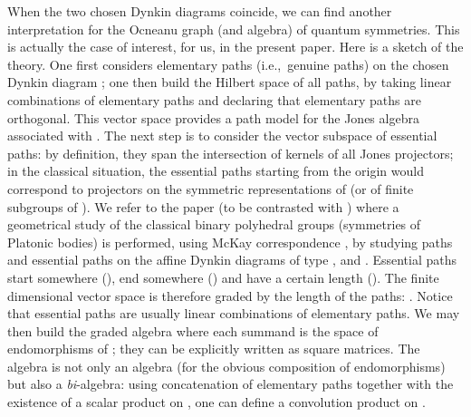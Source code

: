 \documentclass[a4paper,11pt]{article}
\def\ie{{\rm i.e.,\/}\ }
\begin{document}
When the two chosen Dynkin diagrams coincide, we can find
another interpretation for the Ocneanu graph (and algebra)
of quantum symmetries. This is actually the case of interest, for us, in
the present paper. Here is a sketch of the theory.
One first considers elementary paths (\ie genuine
paths) on the chosen Dynkin diagram \coordHE{}; one then build the
Hilbert space \coordHE{} of all paths, by taking linear
combinations of elementary paths and declaring that elementary paths
are orthogonal. This vector space provides a path model for the Jones
algebra associated with \coordHE{}. The next step is to consider the vector subspace
\coordHE{} of essential paths: by definition, they span the
intersection of kernels of all Jones projectors; in the classical
situation, the essential paths starting from the origin
would correspond to projectors on the symmetric
representations of
\coordHE{} (or of finite subgroups of \coordHE{}). We refer to the paper
\cite{Coque:Karpacz} (to be contrasted with \cite{Coque:qtetra}) where a
geometrical study of the classical binary polyhedral groups \cite{Klein}
(symmetries of Platonic
bodies) is performed, using McKay correspondence \cite{McKay}, by
studying paths and essential paths on the
affine Dynkin diagrams of type \coordHE{}, \coordHE{} and
\coordHE{}.
Essential paths start somewhere (\coordHE{}), end somewhere (\coordHE{}) and have a
certain length (\coordHE{}).
The finite dimensional vector space \coordHE{} is therefore graded by
the length \coordHE{} of the paths: \coordHE{}. Notice that essential paths are usually
linear combinations of elementary paths. We may then build the graded
algebra \coordHE{} where
each summand is the space of endomorphisms of \coordHE{};
they can be explicitly written as  square matrices.
The algebra \coordHE{} is not only an algebra (for the obvious
composition \myHighlight{$\circ$}\coordHE{} of endomorphisms) but also a {\sl bi}-algebra:
using concatenation of elementary paths together with the existence 
of a scalar product on \coordHE{},  one can define
a convolution product \myHighlight{$\ast$}\coordHE{} on \coordHE{}.
\end{document}
